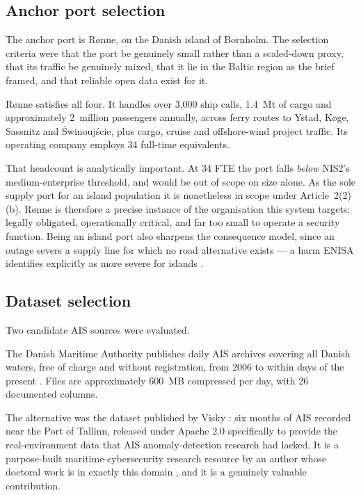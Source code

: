 \documentclass[conference]{IEEEtran}
\begin{document}
\subsection{Anchor port selection}

The anchor port is Rønne, on the Danish island of Bornholm. The selection criteria
were that the port be genuinely small rather than a scaled-down proxy, that its
traffic be genuinely mixed, that it lie in the Baltic region as the brief framed,
and that reliable open data exist for it.

Rønne satisfies all four. It handles over 3{,}000 ship calls, 1.4~Mt of cargo and
approximately 2~million passengers annually, across ferry routes to Ystad, Køge,
Sassnitz and Świnoujście, plus cargo, cruise and offshore-wind project traffic. Its
operating company employs 34 full-time equivalents.

That headcount is analytically important. At 34 FTE the port falls \emph{below}
NIS2's medium-enterprise threshold, and would be out of scope on size alone. As the
sole supply port for an island population it is nonetheless in scope under
Article~2(2)(b). Rønne is therefore a precise instance of the organisation this
system targets: legally obligated, operationally critical, and far too small to
operate a security function. Being an island port also sharpens the consequence
model, since an outage severs a supply line for which no road alternative exists
--- a harm ENISA identifies explicitly as more severe for islands \cite{enisa2020}.

\subsection{Dataset selection}
\label{sec:datachoice}

Two candidate AIS sources were evaluated.

The Danish Maritime Authority publishes daily AIS archives covering all Danish
waters, free of charge and without registration, from 2006 to within days of the
present \cite{dma}. Files are approximately 600~MB compressed per day, with 26
documented columns.

The alternative was the dataset published by Visky \cite{viskydataset}: six months
of AIS recorded near the Port of Tallinn, released under Apache 2.0 specifically to
provide the real-environment data that AIS anomaly-detection research had lacked.
It is a purpose-built maritime-cybersecurity research resource by an author whose
doctoral work is in exactly this domain \cite{viskythesis}, and it is a genuinely
valuable contribution.
\end{document}
